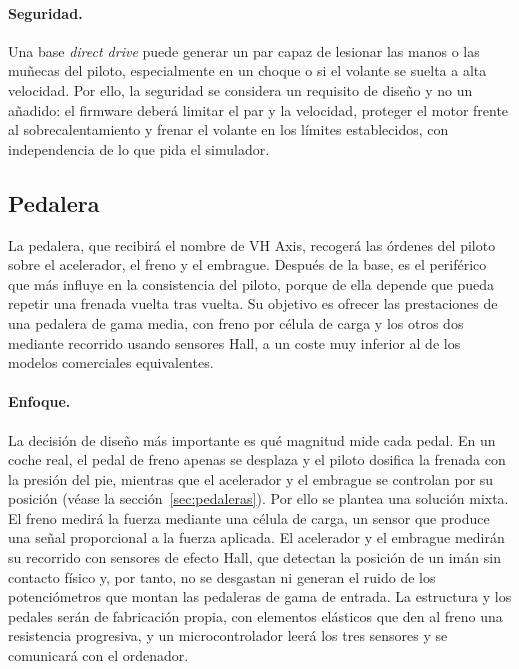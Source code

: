 \paragraph{Seguridad.}
Una base \textit{direct drive} puede generar un par capaz de lesionar las manos o las muñecas del piloto, especialmente en un choque o si el volante se suelta a alta velocidad. Por ello, la seguridad se considera un requisito de diseño y no un añadido: el firmware deberá limitar el par y la velocidad, proteger el motor frente al sobrecalentamiento y frenar el volante en los límites establecidos, con independencia de lo que pida el simulador.



\subsection{Pedalera}
\label{sec:propuesta-pedalera}

La pedalera, que recibirá el nombre de VH Axis, recogerá las órdenes del piloto sobre el acelerador, el freno y el embrague. Después de la base, es el periférico que más influye en la consistencia del piloto, porque de ella depende que pueda repetir una frenada vuelta tras vuelta. Su objetivo es ofrecer las prestaciones de una pedalera de gama media, con freno por célula de carga y los otros dos mediante recorrido usando sensores Hall, a un coste muy inferior al de los modelos comerciales equivalentes.

\paragraph{Enfoque.}
La decisión de diseño más importante es qué magnitud mide cada pedal. En un coche real, el pedal de freno apenas se desplaza y el piloto dosifica la frenada con la presión del pie, mientras que el acelerador y el embrague se controlan por su posición (véase la sección~\ref{sec:pedaleras}). Por ello se plantea una solución mixta. El freno medirá la fuerza mediante una célula de carga, un sensor que produce una señal proporcional a la fuerza aplicada. El acelerador y el embrague medirán su recorrido con sensores de efecto Hall, que detectan la posición de un imán sin contacto físico y, por tanto, no se desgastan ni generan el ruido de los potenciómetros que montan las pedaleras de gama de entrada. La estructura y los pedales serán de fabricación propia, con elementos elásticos que den al freno una resistencia progresiva, y un microcontrolador leerá los tres sensores y se comunicará con el ordenador.

